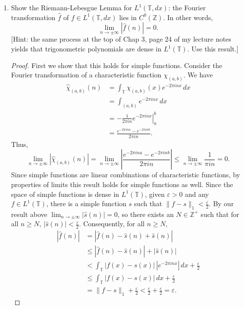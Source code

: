 \documentclass[11pt,oneside,english]{amsart}
\theoremstyle{definition}
\newcommand{\lom}[2]{\lim_{{#1}\rightarrow{#2}}}
\newcommand{\ve}{\varepsilon}
\newcommand{\MB}[1]{\mathbb{#1}}
\begin{document}
\rightline{\today}



\vspace{5mm}
\begin{enumerate}
\itemsep5mm




\item Show the Riemann-Lebesgue Lemma for $L^1(\MB{T},dx)$: the Fourier transformation $\hat f$ of $f\in L^1(\MB{T},dx)$ lies in $C^0(\MB{Z})$. In other words,
\[
\lom{n}{\pm\infty}|\hat f(n)|=0.
\]
[Hint: the same process at the top of Chap 3, page 24 of my lecture notes yields that trigonometric polynomials are dense in $L^1(\MB{T})$. Use this result.]

\begin{proof}
First we show that this holds for simple functions. Consider the Fourier transformation of a characteristic function $\chi_{(a,b)}$. We have
\begin{align*}
\hat \chi_{(a,b)}(n)&=\int_\MB{T}\chi_{(a,b)}(x)e^{-2\pi inx}\,dx\\[2mm]
&=\int_{(a,b)}e^{-2\pi inx}\,dx\\[2mm]
&=\left.-\frac{1}{2\pi in}e^{-2\pi inx}\right|_a^b\\[2mm]
&=\frac{e^{-2\pi ina}-e^{-2\pi inb}}{2\pi i n}.
\end{align*}
Thus,
\[
\lom{n}{\pm\infty}|\hat \chi_{(a,b)}(n)|=\lom{n}{\pm\infty}\left|\frac{e^{-2\pi ina}-e^{-2\pi inb}}{2\pi i n}\right|\leq\lom{n}{\pm\infty}\frac{1}{\pi i n}=0.
\]
Since simple functions are linear combinations of characteristic functions, by properties of limits this result holds for simple functions as well. Since the space of simple functions is dense in $L^1(\MB{T})$, given $\ve>0$ and any $f\in L^1(\MB{T})$, there is a simple function $s$ such that $\|f-s\|_1<\frac{\ve}{2}$. By our result above $\lom{n}{\pm\infty}|\hat s(n)|=0$, so there exists an $N\in \MB{Z}^+$ such that for all $n\geq N$, $|\hat s(n)|<\frac{\ve}{2}$. Consequently, for all $n\geq N$,
\begin{align*}
|\hat f(n)|&=|\hat f(n)-\hat s(n)+\hat s(n)|\\[2mm]
&\leq|\hat f(n)-\hat s(n)|+|\hat s(n)|\\[2mm]
&<\int_\MB{T}|f(x)-s(x)|\,|e^{-2\pi inx}|\,dx+\frac{\ve}{2}\\[2mm]
&\leq\int_\MB{T}|f(x)-s(x)|\,dx+\frac{\ve}{2}\\[2mm]
&=\|f-s\|_1+\frac{\ve}{2}<\frac{\ve}{2}+\frac{\ve}{2}=\ve.
\end{align*}
\end{proof}



\end{enumerate}
\end{document}
